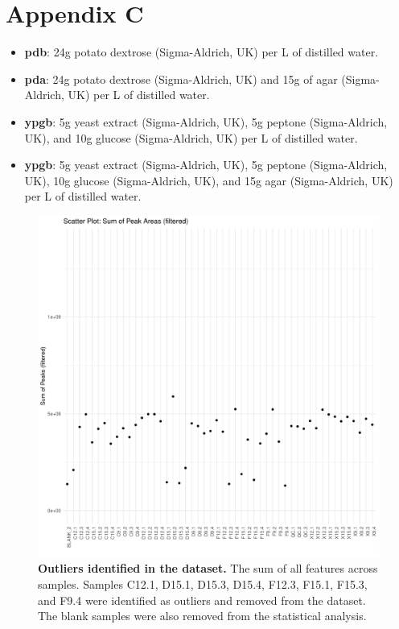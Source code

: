\clearpage
\section{Appendix C}
\label{apx:mediaRecipies}

\begin{itemize}
    \item \textbf{\Acf{pdb}}: 24g potato dextrose (Sigma-Aldrich, UK) per L of distilled water.
    \item \textbf{\Acf{pda}}: 24g potato dextrose (Sigma-Aldrich, UK)  and 15g of agar (Sigma-Aldrich, UK) per L of distilled water.  
    \item \textbf{\Acf{ypgb}}: 5g yeast extract (Sigma-Aldrich, UK), 5g peptone (Sigma-Aldrich, UK), and 10g glucose  (Sigma-Aldrich, UK) per L of distilled water. 
    \item \textbf{\Acf{ypgb}}: 5g yeast extract (Sigma-Aldrich, UK), 5g peptone (Sigma-Aldrich, UK), 10g glucose (Sigma-Aldrich, UK), and 15g agar (Sigma-Aldrich, UK) per L of distilled water.
\end{itemize}

\newpage
\label{apx:outliers}

\begin{figure}[hp!]
    \centering
    \includegraphics[width=\textwidth]{Appendices/sum_plot-filtered.pdf}
    \caption[Outliers identified in the dataset] {\textbf{Outliers identified in the dataset.} The sum of all features across samples. Samples C12.1, D15.1, D15.3, D15.4, F12.3, F15.1, F15.3, and F9.4 were identified as outliers and removed from the dataset. The blank samples were also removed from the statistical analysis.} 
    \label{fig:SampleSumPlot}
\end{figure}

